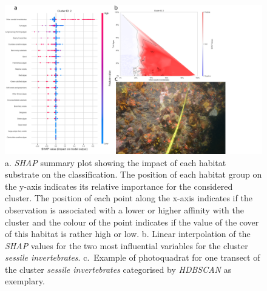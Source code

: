 \begin{figure}
\hypertarget{fig:chap2figS22}{%
\centering
\includegraphics{03-Chapitre2/figures/supplementary/05-explanation_shap_pq_cluster_2.png}
\caption{a. \emph{SHAP} summary plot showing the impact of each habitat
substrate on the classification. The position of each habitat group on
the y-axis indicates its relative importance for the considered cluster.
The position of each point along the x-axis indicates if the observation
is associated with a lower or higher affinity with the cluster and the
colour of the point indicates if the value of the cover of this habitat
is rather high or low. b. Linear interpolation of the \emph{SHAP} values
for the two most influential variables for the cluster \emph{sessile
invertebrates}. c.~Example of photoquadrat for one transect of the
cluster \emph{sessile invertebrates} categorised by \emph{HDBSCAN} as
exemplary.}\label{fig:chap2figS22}
}
\end{figure}

